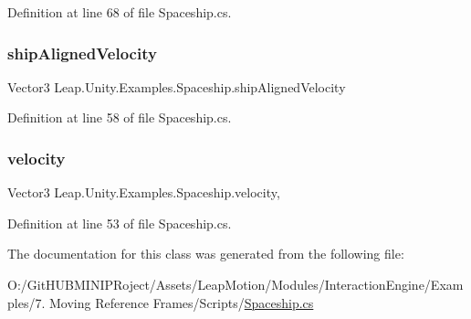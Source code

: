 Definition at line 68 of file Spaceship.\+cs.

\mbox{\label{class_leap_1_1_unity_1_1_examples_1_1_spaceship_ae135263bab134965e23c622b8be345ce}} 
\subsubsection{\texorpdfstring{shipAlignedVelocity}{shipAlignedVelocity}}
{\footnotesize\ttfamily Vector3 Leap.\+Unity.\+Examples.\+Spaceship.\+ship\+Aligned\+Velocity\hspace{0.3cm}{\ttfamily [get]}}



Definition at line 58 of file Spaceship.\+cs.

\mbox{\label{class_leap_1_1_unity_1_1_examples_1_1_spaceship_a85db85a569f39191c86b6d13e64a5d72}} 
\subsubsection{\texorpdfstring{velocity}{velocity}}
{\footnotesize\ttfamily Vector3 Leap.\+Unity.\+Examples.\+Spaceship.\+velocity\hspace{0.3cm}{\ttfamily [get]}, {\ttfamily [set]}}



Definition at line 53 of file Spaceship.\+cs.



The documentation for this class was generated from the following file\+:\begin{DoxyCompactItemize}
\item 
O\+:/\+Git\+H\+U\+B\+M\+I\+N\+I\+P\+Roject/\+Assets/\+Leap\+Motion/\+Modules/\+Interaction\+Engine/\+Examples/7. Moving Reference Frames/\+Scripts/\mbox{\hyperlink{_spaceship_8cs}{Spaceship.\+cs}}\end{DoxyCompactItemize}
